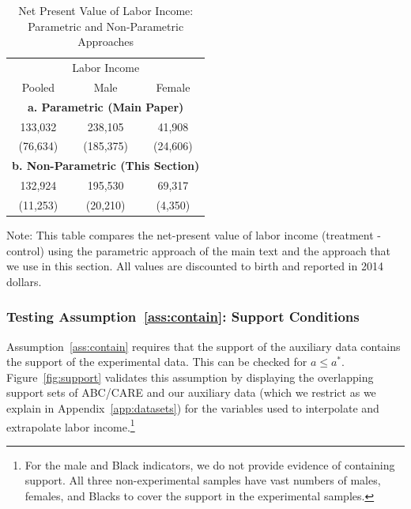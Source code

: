 \begin{table}[H]
\begin{threeparttable}
\caption{Net Present Value of Labor Income: Parametric and Non-Parametric Approaches}
\label{table:nvpli}
\centering
\begin{tabular}{ccc} \toprule
\multicolumn{3}{c}{Labor Income} \\
Pooled & Male & Female \\ \midrule
\multicolumn{3}{c}{\textbf{a. Parametric (Main Paper)}} \\
133,032 & 238,105 & 41,908 \\
(76,634) & (185,375) & (24,606) \\
\multicolumn{3}{c}{\textbf{b. Non-Parametric (This Section)}} \\
132,924 & 195,530 & 69,317 \\
(11,253) & (20,210) & (4,350) \\ \bottomrule
\end{tabular}
\begin{tablenotes}
\footnotesize
\item Note: This table compares the net-present value of labor income (treatment - control) using the parametric approach of the main text and the approach that we use in this section. All values are discounted to birth and reported in 2014 dollars.
\end{tablenotes}
\end{threeparttable}
\end{table}

\subsubsection{Testing Assumption~\ref{ass:contain}: Support Conditions}\label{app:containsupport}

Assumption~\ref{ass:contain} requires that the support of the auxiliary data contains the support of the experimental data. This can be checked for $a \leq a^\ast$. Figure~\ref{fig:support} validates this assumption by displaying the overlapping support sets of ABC/CARE and our auxiliary data (which we restrict as we explain in Appendix~\ref{app:datasets}) for the variables used to interpolate and extrapolate labor income.\footnote{For the male and Black indicators, we do not provide evidence of containing support. All three non-experimental samples have vast numbers of males, females, and Blacks to cover the support in the experimental samples.}


